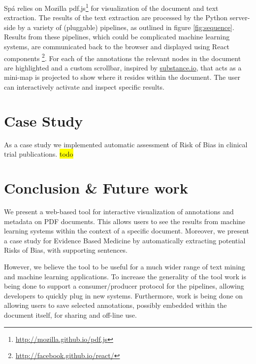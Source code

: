 \documentclass[runningheads,a4paper]{llncs}
\newcommand{\highlight}[1]{\colorbox{yellow}{#1}}
\begin{document}
Spá relies on Mozilla pdf.js\footnote{\url{http://mozilla.github.io/pdf.js}} for visualization of the document and text extraction.
The results of the text extraction are processed by the Python server-side by a variety of (pluggable) pipelines, as outlined in figure \ref{fig:sequence}.
Results from these pipelines, which could be complicated machine learning systems, are communicated back to the browser and displayed using React components \footnote{\url{http://facebook.github.io/react/}}.
For each of the annotations the relevant nodes in the document are highlighted and a custom scrollbar, inspired by \href{http://substance.io/}{substance.io}, that acts as a mini-map is projected to show where it resides within the document.
The user can interactively activate and inspect specific results.
\section{Case Study}
\label{sec-3}
As a case study we implemented automatic assessment of Risk of Bias in clinical trial publications.
\highlight{todo}
\section{Conclusion \& Future work}
\label{sec-4}
We present a web-based tool for interactive visualization of annotations and metadata on PDF documents.
This allows users to see the results from machine learning systems within the context of a specific document.
Moreover, we present a case study for Evidence Based Medicine by automatically extracting potential Risks of Bias, with supporting sentences.

However, we believe the tool to be useful for a much wider range of text mining and machine learning applications.
To increase the generality of the tool work is being done to support a consumer/producer protocol for the pipelines, allowing developers to quickly plug in new systems.
Furthermore, work is being done on allowing users to save selected annotations, possibly embedded within the document itself, for sharing and off-line use.



\end{document}
